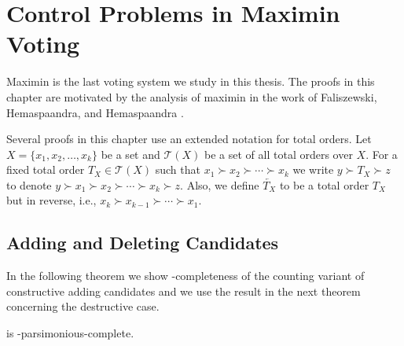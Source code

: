 \chapter{Control Problems in Maximin Voting} \label{ch:maximin}

Maximin is the last voting system we study in this thesis.
The proofs in this chapter are motivated by the analysis of maximin in the work of Faliszewski, Hemaspaandra, and Hemaspaandra \cite{faliszewski3}.

Several proofs in this chapter use an extended notation for total orders.
Let $X=\{x_1,x_2,\dots,x_k\}$ be a set and $\mathcal{T}(X)$ be a set of all total orders over $X$.
For a fixed total order $T_X\in\mathcal{T}(X)$ such that $x_1\succ x_2\succ\cdots\succ x_k$ we write $y\succ T_X\succ z$ to denote $y\succ x_1\succ x_2\succ\cdots\succ x_k\succ z$.
Also, we define $\overleftarrow{T_X}$ to be a total order $T_X$ but in reverse, i.e., $x_k\succ x_{k-1}\succ\cdots\succ x_1$.

\section{Adding and Deleting Candidates} \label{sec:mmcan}

In the following theorem we show \sharpPclass-completeness of the counting variant of constructive adding candidates and we use the result in the next theorem concerning the destructive case.

\begin{theorem} \label{th:mmacc}
	 is \sharpPclass-parsimonious-complete.
\end{theorem}

